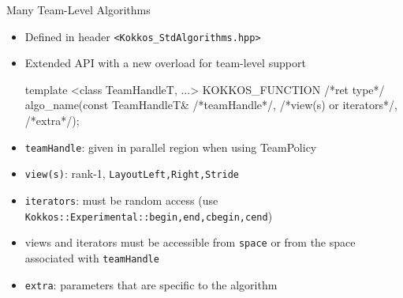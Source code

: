 \begin{frame}[fragile]{Many Team-Level Algorithms}

\begin{itemize}
\item Defined in header \texttt{<Kokkos\_StdAlgorithms.hpp>}
\item Extended API with a new overload for team-level support

\begin{code}[keywords={sort}]
template <class TeamHandleT, ...>
KOKKOS_FUNCTION
/*ret type*/ algo_name(const TeamHandleT& /*teamHandle*/,
                       /*view(s) or iterators*/,
                       /*extra*/);
\end{code}

\item \texttt{teamHandle}: given in parallel region when using TeamPolicy

\item \texttt{view(s)}: rank-1, \texttt{LayoutLeft,Right,Stride}

\item \texttt{iterators}: must be random access (use \texttt{Kokkos::Experimental::begin,end,cbegin,cend})

\item views and iterators must be accessible from \texttt{space} or from the space associated with \texttt{teamHandle}

\item \texttt{extra}: parameters that are specific to the algorithm

\end{itemize}

\end{frame}


